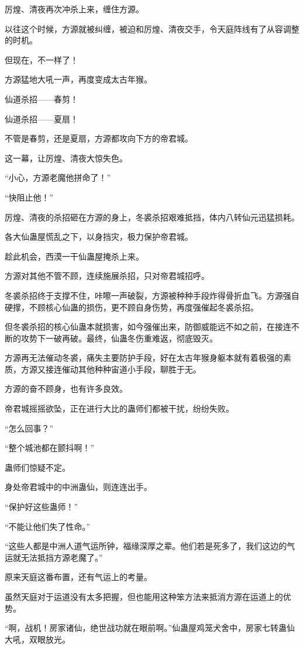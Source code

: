 \begin{this_body}
厉煌、清夜再次冲杀上来，缠住方源。

以往这个时候，方源就被纠缠，被迫和厉煌、清夜交手，令天庭阵线有了从容调整的时机。

但现在，不一样了！

方源猛地大吼一声，再度变成太古年猴。

仙道杀招——春剪！

仙道杀招——夏扇！

不管是春剪，还是夏扇，方源都攻向下方的帝君城。

这一幕，让厉煌、清夜大惊失色。

“小心，方源老魔他拼命了！”

“快阻止他！”

厉煌、清夜的杀招砸在方源的身上，冬裘杀招艰难抵挡，体内八转仙元迅猛损耗。

各大仙蛊屋慌乱之下，以身挡灾，极力保护帝君城。

趁此机会，西漠一干仙蛊屋掩杀上来。

方源对其他不管不顾，连续施展杀招，只对帝君城招呼。

冬裘杀招终于支撑不住，咔嚓一声破裂，方源被种种手段炸得骨折血飞。方源强自硬撑，不顾核心仙蛊的损伤，更不顾自身伤势，再度强催起冬裘杀招。

但冬裘杀招的核心仙蛊本就损害，如今强催出来，防御威能远不如之前，在接连不断的攻势下一破再破。最终，仙蛊冬伤重难返，彻底毁灭。

方源再无法催动冬裘，痛失主要防护手段，好在太古年猴身躯本就有着极强的素质，方源又接连催动其他种种宙道小手段，聊胜于无。

方源的奋不顾身，也有许多良效。

帝君城摇摇欲坠，正在进行大比的蛊师们都被干扰，纷纷失败。

“怎么回事？”

“整个城池都在颤抖啊！”

蛊师们惊疑不定。

身处帝君城中的中洲蛊仙，则连连出手。

“保护好这些蛊师！”

“不能让他们失了性命。”

“这些人都是中洲人道气运所钟，福缘深厚之辈。他们若是死多了，我们这边的气运就无法抵挡方源老魔了。”

原来天庭这番布置，还有气运上的考量。

虽然天庭对于运道没有太多把握，但也能用这种笨方法来抵消方源在运道上的优势。

“啊，战机！房家诸仙，绝世战功就在眼前啊。”仙蛊屋鸡笼犬舍中，房家七转蛊仙大吼，双眼放光。


\end{this_body}
